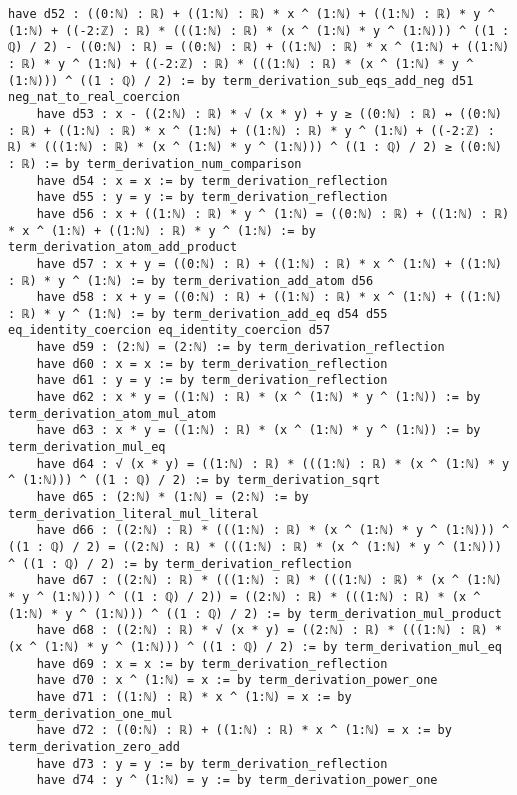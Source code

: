 \documentclass{article}
\begin{document}
\begin{tcolorbox}[colback=white!10, width=\linewidth]
\begin{lstlisting}[language=Lean4]
    have d52 : ((0:ℕ) : ℝ) + ((1:ℕ) : ℝ) * x ^ (1:ℕ) + ((1:ℕ) : ℝ) * y ^ (1:ℕ) + ((-2:ℤ) : ℝ) * (((1:ℕ) : ℝ) * (x ^ (1:ℕ) * y ^ (1:ℕ))) ^ ((1 : ℚ) / 2) - ((0:ℕ) : ℝ) = ((0:ℕ) : ℝ) + ((1:ℕ) : ℝ) * x ^ (1:ℕ) + ((1:ℕ) : ℝ) * y ^ (1:ℕ) + ((-2:ℤ) : ℝ) * (((1:ℕ) : ℝ) * (x ^ (1:ℕ) * y ^ (1:ℕ))) ^ ((1 : ℚ) / 2) := by term_derivation_sub_eqs_add_neg d51 neg_nat_to_real_coercion
    have d53 : x - ((2:ℕ) : ℝ) * √ (x * y) + y ≥ ((0:ℕ) : ℝ) ↔ ((0:ℕ) : ℝ) + ((1:ℕ) : ℝ) * x ^ (1:ℕ) + ((1:ℕ) : ℝ) * y ^ (1:ℕ) + ((-2:ℤ) : ℝ) * (((1:ℕ) : ℝ) * (x ^ (1:ℕ) * y ^ (1:ℕ))) ^ ((1 : ℚ) / 2) ≥ ((0:ℕ) : ℝ) := by term_derivation_num_comparison
    have d54 : x = x := by term_derivation_reflection
    have d55 : y = y := by term_derivation_reflection
    have d56 : x + ((1:ℕ) : ℝ) * y ^ (1:ℕ) = ((0:ℕ) : ℝ) + ((1:ℕ) : ℝ) * x ^ (1:ℕ) + ((1:ℕ) : ℝ) * y ^ (1:ℕ) := by term_derivation_atom_add_product
    have d57 : x + y = ((0:ℕ) : ℝ) + ((1:ℕ) : ℝ) * x ^ (1:ℕ) + ((1:ℕ) : ℝ) * y ^ (1:ℕ) := by term_derivation_add_atom d56
    have d58 : x + y = ((0:ℕ) : ℝ) + ((1:ℕ) : ℝ) * x ^ (1:ℕ) + ((1:ℕ) : ℝ) * y ^ (1:ℕ) := by term_derivation_add_eq d54 d55 eq_identity_coercion eq_identity_coercion d57
    have d59 : (2:ℕ) = (2:ℕ) := by term_derivation_reflection
    have d60 : x = x := by term_derivation_reflection
    have d61 : y = y := by term_derivation_reflection
    have d62 : x * y = ((1:ℕ) : ℝ) * (x ^ (1:ℕ) * y ^ (1:ℕ)) := by term_derivation_atom_mul_atom
    have d63 : x * y = ((1:ℕ) : ℝ) * (x ^ (1:ℕ) * y ^ (1:ℕ)) := by term_derivation_mul_eq
    have d64 : √ (x * y) = ((1:ℕ) : ℝ) * (((1:ℕ) : ℝ) * (x ^ (1:ℕ) * y ^ (1:ℕ))) ^ ((1 : ℚ) / 2) := by term_derivation_sqrt
    have d65 : (2:ℕ) * (1:ℕ) = (2:ℕ) := by term_derivation_literal_mul_literal
    have d66 : ((2:ℕ) : ℝ) * (((1:ℕ) : ℝ) * (x ^ (1:ℕ) * y ^ (1:ℕ))) ^ ((1 : ℚ) / 2) = ((2:ℕ) : ℝ) * (((1:ℕ) : ℝ) * (x ^ (1:ℕ) * y ^ (1:ℕ))) ^ ((1 : ℚ) / 2) := by term_derivation_reflection
    have d67 : ((2:ℕ) : ℝ) * (((1:ℕ) : ℝ) * (((1:ℕ) : ℝ) * (x ^ (1:ℕ) * y ^ (1:ℕ))) ^ ((1 : ℚ) / 2)) = ((2:ℕ) : ℝ) * (((1:ℕ) : ℝ) * (x ^ (1:ℕ) * y ^ (1:ℕ))) ^ ((1 : ℚ) / 2) := by term_derivation_mul_product
    have d68 : ((2:ℕ) : ℝ) * √ (x * y) = ((2:ℕ) : ℝ) * (((1:ℕ) : ℝ) * (x ^ (1:ℕ) * y ^ (1:ℕ))) ^ ((1 : ℚ) / 2) := by term_derivation_mul_eq
    have d69 : x = x := by term_derivation_reflection
    have d70 : x ^ (1:ℕ) = x := by term_derivation_power_one
    have d71 : ((1:ℕ) : ℝ) * x ^ (1:ℕ) = x := by term_derivation_one_mul
    have d72 : ((0:ℕ) : ℝ) + ((1:ℕ) : ℝ) * x ^ (1:ℕ) = x := by term_derivation_zero_add
    have d73 : y = y := by term_derivation_reflection
    have d74 : y ^ (1:ℕ) = y := by term_derivation_power_one

\end{lstlisting}
\end{tcolorbox}
\end{document}
